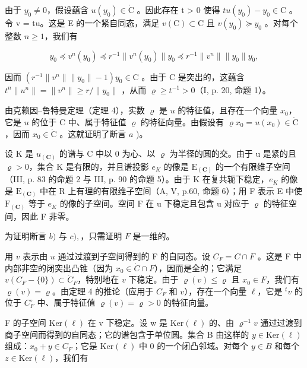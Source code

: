 由于 \(y_{0} \neq 0\)，假设蕴含 \(u(y_{0}) \in \mathring{\mathrm{C}}\) 。因此存在 t \textgreater{} 0 使得 \(tu(y_{0}) - y_{0} \in \mathrm{C}\) 。令 v = tu。这是 E 的一个紧自同态，满足 \(v(\mathrm{C}) \subset \mathrm{C}\) 且 \(v(y_{0}) \succcurlyeq y_{0}\) 。对每个整数 \(n \geqslant 1\)，我们有

\[
y _ {0} \preccurlyeq v ^ {n} (y _ {0}) \preccurlyeq r ^ {- 1} \| v ^ {n} (y _ {0}) \| y _ {0} \preccurlyeq r ^ {- 1} \| v ^ {n} \| \| y _ {0} \| y _ {0},
\]

因而 \((r^{-1}\|v^{n}\|\|y_{0}\|-1)y_{0}\in\mathrm{C}\) 。由于 C 是突出的，这蕴含 \(t^{n}\|u^{n}\|=\|v^{n}\|\geqslant r/\|y_{0}\|\) ，从而 \(\varrho\geqslant t^{-1}>0\)（I, p. 20, 命题 1）。

由克赖因–鲁特曼定理（定理 4），实数 \(\varrho\) 是 \(u\) 的特征值，且存在一个向量 \(x_0\)，它是 \(u\) 的位于 C 中、属于特征值 \(\varrho\) 的特征向量。由假设有 \(\varrho x_0 = u(x_0) \in \mathring{\mathrm{C}}\)，因而 \(x_0 \in \mathring{\mathrm{C}}\) 。这就证明了断言 \(a\) )。

设 K 是 \(u_{(\mathbf{C})}\) 的谱与 C 中以 0 为心、以 \(\varrho\) 为半径的圆的交。由于 u 是紧的且 \(\varrho > 0\)，集合 K 是有限的，并且谱投影 \(e_{K}\) 的像是 \(\mathrm{E}_{(\mathbf{C})}\) 的一个有限维子空间（III, p. 83 的命题 2 与 III, p. 90 的命题 5）。由于 K 在复共轭下稳定，\(e_{K}\) 的像是 \(\mathrm{E}_{(\mathbf{C})}\) 中在 R 上有理的有限维子空间（A, V, p.60, 命题 6）；用 F 表示 E 中使 \(\mathrm{F}_{(\mathbf{C})}\) 等于 \(e_{K}\) 的像的子空间。空间 F 在 u 下稳定且包含 u 对应于 \(\varrho\) 的特征空间，因此 F 非零。

为证明断言 \(b)\) 与 \(c),\)，只需证明 \(F\) 是一维的。

用 \(v\) 表示由 \(u\) 通过过渡到子空间得到的 F 的自同态。设 \(C_F = C \cap F\) 。这是 F 中内部非空的闭突出凸锥（因为 \(x_0 \in \mathring{C} \cap F\)），因而是全的；它满足 \(v(C_F - \{0\}) \subset \mathring{C}_F\)，特别地在 \(v\) 下稳定。由于 \(\varrho(v) \leqslant \varrho\) 且 \(x_0 \in F\)，我们有 \(\varrho(v) = \varrho\)。由定理 4 的推论（应用于 \(C_F\) 和 \(v\)），存在一个向量 \(\ell\)，它是 \(^t v\) 的位于 \(C_F^\circ\) 中、属于特征值 \(\varrho(v) = \varrho > 0\) 的特征向量。

F 的子空间 \(\mathrm{Ker}(\ell)\) 在 v 下稳定。设 w 是 \(\mathrm{Ker}(\ell)\) 的、由 \(\varrho^{-1}v\) 通过过渡到商子空间而得到的自同态；它的谱包含于单位圆。集合 B 由这样的 \(y \in \mathrm{Ker}(\ell)\) 组成：\(x_{0} + y \in C_{F}\)；它是 \(\mathrm{Ker}(\ell)\) 中 0 的一个闭凸邻域。对每个 \(y \in B\) 和每个 \(z \in \mathrm{Ker}(\ell)\)，我们有

